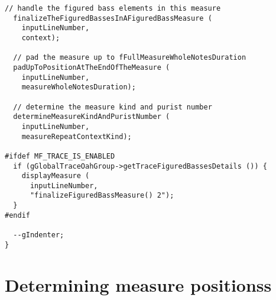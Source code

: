 \begin{lstlisting}[language=CPlusPlus]
  // handle the figured bass elements in this measure
  finalizeTheFiguredBassesInAFiguredBassMeasure (
    inputLineNumber,
    context);

  // pad the measure up to fFullMeasureWholeNotesDuration
  padUpToPositionAtTheEndOfTheMeasure (
    inputLineNumber,
    measureWholeNotesDuration);

  // determine the measure kind and purist number
  determineMeasureKindAndPuristNumber (
    inputLineNumber,
    measureRepeatContextKind);

#ifdef MF_TRACE_IS_ENABLED
  if (gGlobalTraceOahGroup->getTraceFiguredBassesDetails ()) {
    displayMeasure (
      inputLineNumber,
      "finalizeFiguredBassMeasure() 2");
  }
#endif

  --gIndenter;
}
\end{lstlisting}


\section{Determining measure positionss}

